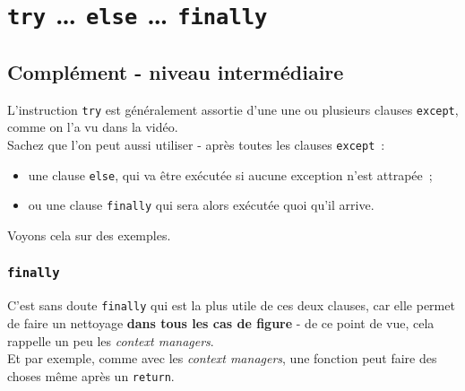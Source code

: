     \hypertarget{try-else-finally}{%
\section{\texorpdfstring{\texttt{try} \ldots{} \texttt{else} \ldots{}
\texttt{finally}}{try \ldots{} else \ldots{} finally}}\label{try-else-finally}}

    \hypertarget{compluxe9ment---niveau-intermuxe9diaire}{%
\subsection{Complément - niveau
intermédiaire}\label{compluxe9ment---niveau-intermuxe9diaire}}

    L'instruction \texttt{try} est généralement assortie d'une une ou
plusieurs clauses \texttt{except}, comme on l'a vu dans la vidéo.\\

Sachez que l'on peut aussi utiliser - après toutes les clauses
\texttt{except}~:

\begin{itemize}
	\item 
	une clause \texttt{else}, qui va être exécutée si
	aucune exception n'est attrapée~;
	\item 
	ou une clause \texttt{finally} qui sera alors exécutée quoi qu'il arrive.
\end{itemize}

    Voyons cela sur des exemples.

    \hypertarget{finally}{%
\subsubsection{\texorpdfstring{\texttt{finally}}{finally}}\label{finally}}

    C'est sans doute \texttt{finally} qui est la plus utile de ces deux
clauses, car elle permet de faire un nettoyage \textbf{dans tous les cas
de figure} - de ce point de vue, cela rappelle un peu les \emph{context
managers}.\\

Et par exemple, comme avec les \emph{context managers}, une fonction
peut faire des choses même après un \texttt{return}.

